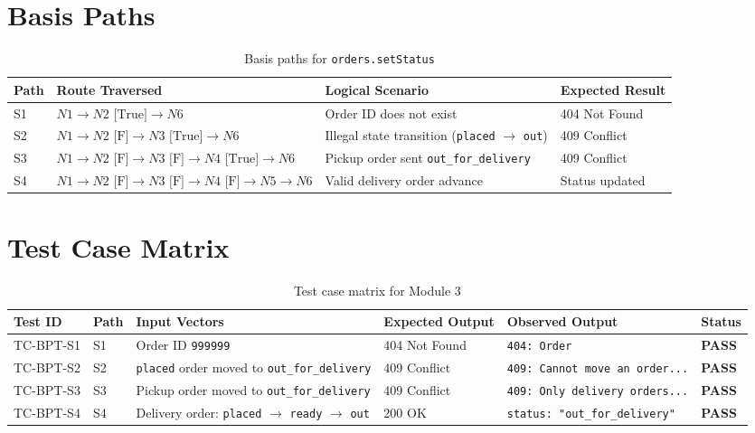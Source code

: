 \documentclass[12pt, a4paper]{report}
\begin{document}
\section{Basis Paths}
\begin{table}[H]
\centering
\footnotesize
\begin{tabularx}{\textwidth}{L{1.2cm} L{5.8cm} L{5.5cm} L{2.8cm}}
\toprule
\textbf{Path} & \textbf{Route Traversed} & \textbf{Logical Scenario} & \textbf{Expected Result} \\
\midrule
S1 & $N1 \to N2\text{ [True]} \to N6$ & Order ID does not exist & 404 Not Found \\
S2 & $N1 \to N2\text{ [F]} \to N3\text{ [True]} \to N6$ & Illegal state transition (\texttt{placed} $\to$ \texttt{out}) & 409 Conflict \\
S3 & $N1 \to N2\text{ [F]} \to N3\text{ [F]} \to N4\text{ [True]} \to N6$ & Pickup order sent \texttt{out\_for\_delivery} & 409 Conflict \\
S4 & $N1 \to N2\text{ [F]} \to N3\text{ [F]} \to N4\text{ [F]} \to N5 \to N6$ & Valid delivery order advance & Status updated \\
\bottomrule
\end{tabularx}
\caption{Basis paths for \texttt{orders.setStatus}}
\label{tab:paths_3}
\end{table}

\section{Test Case Matrix}
\begin{table}[H]
\centering
\footnotesize
\begin{tabularx}{\textwidth}{L{2.0cm} C{0.8cm} L{3.5cm} L{3.5cm} L{3.8cm} C{1.2cm}}
\toprule
\textbf{Test ID} & \textbf{Path} & \textbf{Input Vectors} & \textbf{Expected Output} & \textbf{Observed Output} & \textbf{Status} \\
\midrule
TC-BPT-S1 & S1 & Order ID \texttt{999999} & 404 Not Found & \texttt{404: Order} & \textbf{PASS} \\
TC-BPT-S2 & S2 & \texttt{placed} order moved to \texttt{out\_for\_delivery} & 409 Conflict & \texttt{409: Cannot move an order...} & \textbf{PASS} \\
TC-BPT-S3 & S3 & Pickup order moved to \texttt{out\_for\_delivery} & 409 Conflict & \texttt{409: Only delivery orders...} & \textbf{PASS} \\
TC-BPT-S4 & S4 & Delivery order: \texttt{placed} $\to$ \texttt{ready} $\to$ \texttt{out} & 200 OK & \texttt{status: "out\_for\_delivery"} & \textbf{PASS} \\
\bottomrule
\end{tabularx}
\caption{Test case matrix for Module 3}
\label{tab:matrix_3}
\end{table}
\end{document}
